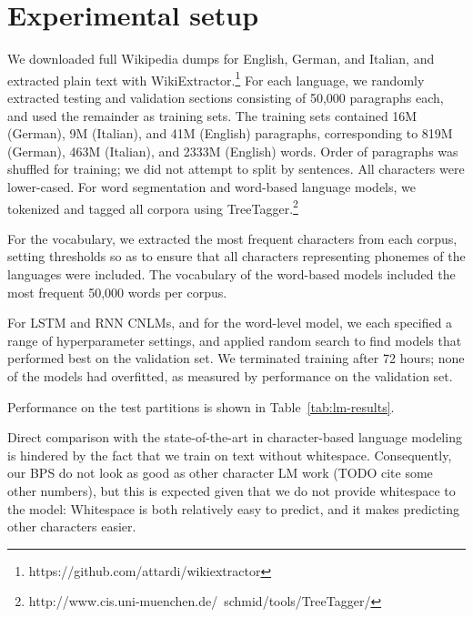 \section{Experimental setup}
\label{sec:setup}

We downloaded full Wikipedia dumps for English, German, and Italian, and extracted plain text with WikiExtractor.\footnote{https://github.com/attardi/wikiextractor}
For each language, we randomly extracted testing and validation sections consisting of 50,000 paragraphs each, and used the remainder as training sets.
The training sets contained 16M (German), 9M (Italian), and 41M (English) paragraphs, corresponding to 819M (German), 463M (Italian), and 2333M (English) words.
Order of paragraphs was shuffled for training; we did not attempt to split by sentences.
All characters were lower-cased.
For word segmentation and word-based language models, we tokenized and tagged all corpora using TreeTagger.\footnote{http://www.cis.uni-muenchen.de/~schmid/tools/TreeTagger/}

For the vocabulary, we extracted the most frequent characters from each corpus, setting thresholds so as to ensure that all characters representing phonemes of the languages were included.
The vocabulary of the word-based models included the most frequent 50,000 words per corpus.


For LSTM and RNN CNLMs, and for the word-level model, we each specified a range of hyperparameter settings, and applied random search to find models that performed best on the validation set.
We terminated training after 72 hours; none of the models had overfitted, as measured by performance on the validation set.

Performance on the test partitions is shown in Table~\ref{tab:lm-results}.

Direct comparison with the state-of-the-art in character-based language modeling is hindered by the fact that we train on text without whitespace.
Consequently, our BPS do not look as good as other character LM work (TODO cite some other numbers), but this is expected given that we do not provide whitespace to the model: Whitespace is both relatively easy to predict, and it makes predicting other characters easier.



